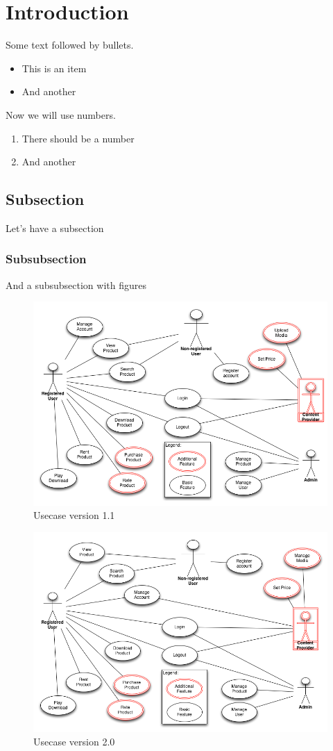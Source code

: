 \section{Introduction}
Some text followed by bullets.
\begin{itemize}
\item This is an item
\item And another
\end{itemize}
Now we will use numbers.
\begin{enumerate}
\item There should be a number
\item And another
\end{enumerate}
\subsection{Subsection}
Let's have a subsection
\subsubsection{Subsubsection}
And a subsubsection with figures
\begin{figure}[H]
  \includegraphics[width=\textwidth]{illustrations/UseCase_ver1.png}
  \caption{Usecase version 1.1}
  \label{dailyscrum}
\end{figure}
\begin{figure}[H]
  \includegraphics[width=\textwidth]{illustrations/UseCase_ver2.png}
  \caption{Usecase version 2.0}
  \label{burndown}
\end{figure}

